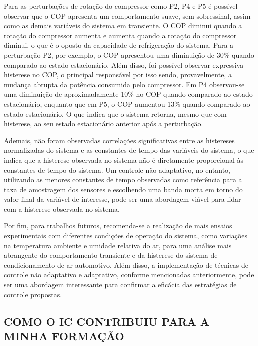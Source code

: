 Para as perturbações de rotação do compressor como P2, P4 e P5 é possível observar que o COP apresenta um comportamento suave, sem sobressinal, assim como as demais variáveis do sistema em transiente. O COP diminui quando a rotação do compressor aumenta e aumenta quando a rotação do compressor diminui, o que é o oposto da capacidade de refrigeração do sistema. Para a perturbação P2, por exemplo, o COP apresentou uma diminuição de 30\% quando comparado ao estado estacionário. 
\newpage
Além disso, foi possível observar expressiva histerese no COP, o principal responsável por isso sendo, provavelmente, a mudança abrupta da potência consumida pelo compressor. Em P4  observou-se uma diminuição de aproximadamente 10\% no COP quando comparado ao estado estacionário, enquanto que em P5, o COP aumentou 13\% quando comparado ao estado estacionário.  O que indica que o sistema retorna, mesmo que com histerese, ao seu estado estacionário anterior após a perturbação.

Ademais, não foram observadas correlações significativas entre as histereses normalizadas do sistema e as constantes de tempo das variáveis do sistema, o que indica que a histerese observada no sistema não é diretamente proporcional às constantes de tempo do sistema. Um controle não adaptativo, no entanto, utilizando as menores constantes de tempo observadas como referência para a taxa de amostragem dos sensores e escolhendo uma banda morta em torno do valor final da variável de interesse, pode ser uma abordagem viável para lidar com a histerese observada no sistema.

Por fim, para trabalhos futuros, recomenda-se a realização de mais ensaios experimentais com diferentes condições de operação do sistema, como variações na temperatura ambiente e umidade relativa do ar, para uma análise mais abrangente do comportamento transiente e da histerese do sistema de condicionamento de ar automotivo. Além disso, a implementação de técnicas de controle não adaptativo e adaptativo, conforme mencionadas anteriormente, pode ser uma abordagem interessante para confirmar a eficácia das estratégias de controle propostas.

\newpage
\subsection{\MakeUppercase{ Como o IC Contribuiu para a Minha Formação}}

